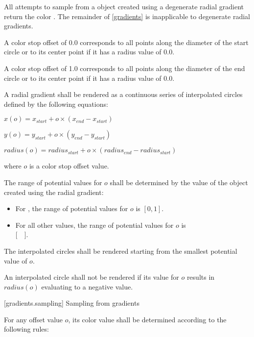 \pnum
All attempts to sample from a  object created using a degenerate radial gradient return the color . The remainder of \ref{gradients} is inapplicable to degenerate radial gradients.

\pnum
A color stop offset of 0.0 corresponds to all points along the diameter of the start circle or to its center point if it has a radius value of 0.0.

\pnum
A color stop offset of 1.0 corresponds to all points along the diameter of the end circle or to its center point if it has a radius value of 0.0.

\pnum
A radial gradient shall be rendered as a continuous series of interpolated circles defined by the following equations:
\begin{enumeratea}
\item $x(o) = x_{start} + o \times (x_{end} - x_{start})$
\item $y(o) = y_{start} + o \times (y_{end} - y_{start})$
\item $radius(o) = radius_{start} + o \times (radius_{end} - radius_{start})$
\end{enumeratea}
where $o$ is a color stop offset value.

\pnum
The range of potential values for $o$ shall be determined by the  value of the  object created using the radial gradient:
\begin{itemize}
\item For , the range of potential values for $o$ is $[0,1]$.
\item For all other  values, the range of potential values for $o$ is\\ $[$~~$]$.
\end{itemize}

\pnum
The interpolated circles shall be rendered starting from the smallest potential value of $o$.

\pnum
An interpolated circle shall not be rendered if its value for $o$ results in $radius(o)$ evaluating to a negative value.

 [gradients.sampling] {Sampling from gradients}

\pnum
For any offset value $o$, its color value shall be determined according to the following rules:

